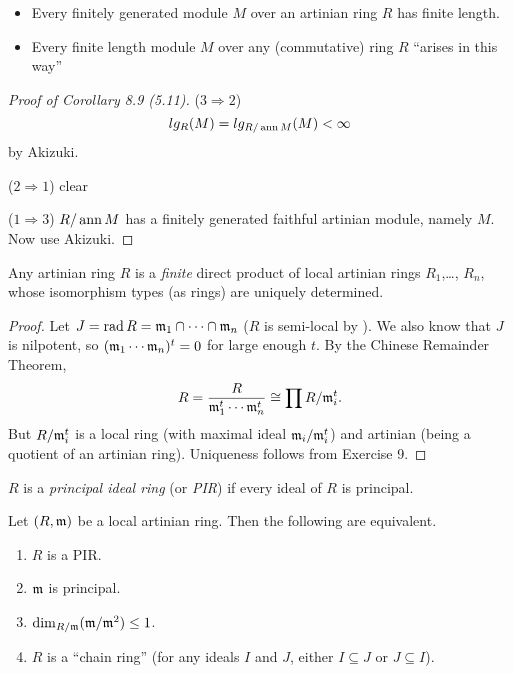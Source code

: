  \setcounter{lecture}{9}

 \begin{itemize}
   \item Every finitely generated module $M$ over an artinian ring $R$ has finite length.
   \item Every finite length module $M$ over any (commutative) ring $R$ ``arises in this
   way''
 \end{itemize}

 \begin{proof}[Proof of Corollary 8.9 (5.11)]
   ($3\Rightarrow 2$)
   \[
    lg_R(M)=lg_{R/\operatorname{ann} M}(M) < \infty
   \]
   by Akizuki.

   ($2\Rightarrow 1$) clear

   ($1\Rightarrow 3$) $R/\operatorname{ann} M$ has a finitely generated faithful artinian module,
   namely $M$. Now use Akizuki.
 \end{proof}
 \begin{theorem}
   Any artinian ring $R$ is a \emph{finite} direct product of local artinian rings
   $R_1$,\dots, $R_n$, whose isomorphism types (as rings) are uniquely determined.
 \end{theorem}
 \begin{proof}
   Let $J=\operatorname{rad} R = \mathfrak{m}_1\cap\cdots\cap \mathfrak{m}_n$ ($R$ is semi-local by \anton{}). We also know
   that $J$ is nilpotent, so $(\mathfrak{m}_1\cdots\mathfrak{m}_n)^t=0$ for large enough $t$. By the Chinese
   Remainder Theorem,
   \[
     R=\frac{R}{\mathfrak{m}_1^t\cdots \mathfrak{m}_n^t} \cong \prod R/\mathfrak{m}_i^t.
   \]
   But $R/\mathfrak{m}_i^t$ is a local ring (with maximal ideal $\mathfrak{m}_i/\mathfrak{m}_i^t$) and artinian (being
   a quotient of an artinian ring). Uniqueness follows from Exercise 9.
 \end{proof}
 \begin{definition}
   $R$ is a \emph{principal ideal ring} (or \emph{PIR}) if every ideal of $R$ is
   principal.
 \end{definition}
 \begin{theorem}[5.13]
   Let $(R,\mathfrak{m})$ be a local artinian ring. Then the following are equivalent.
   \begin{enumerate}
     \item $R$ is a PIR.
     \item $\mathfrak{m}$ is principal.
     \item $\dim_{R/\mathfrak{m}}(\mathfrak{m}/\mathfrak{m}^2)\le 1$.
     \item $R$ is a ``chain ring'' (for any ideals $I$ and $J$, either $I\subseteq J$ or
     $J\subseteq I$).
   \end{enumerate}
 \end{theorem}
